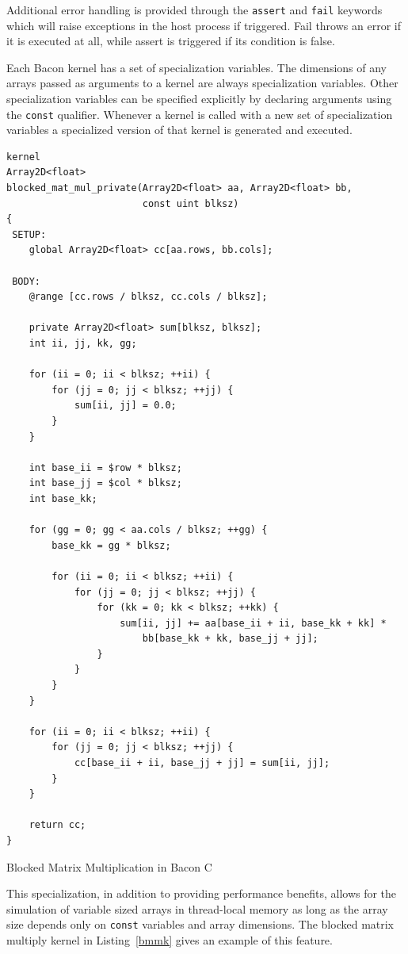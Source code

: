 \documentclass{llncs}
\begin{document}
Additional error handling is provided through the {\tt assert} and
{\tt fail} keywords which will raise exceptions in the host process if
triggered. Fail throws an error if it is executed at all, while assert
is triggered if its condition is false.

Each Bacon kernel has a set of specialization variables. The
dimensions of any arrays passed as arguments to a kernel are always
specialization variables. Other specialization variables can be
specified explicitly by declaring arguments using the {\tt const}
qualifier. Whenever a kernel is called with a new set of
specialization variables a specialized version of that kernel is
generated and executed.

\begin{listing}[t!]
\begin{verbatim}
kernel
Array2D<float>
blocked_mat_mul_private(Array2D<float> aa, Array2D<float> bb, 
                        const uint blksz)
{
 SETUP:
    global Array2D<float> cc[aa.rows, bb.cols];

 BODY:
    @range [cc.rows / blksz, cc.cols / blksz];

    private Array2D<float> sum[blksz, blksz];
    int ii, jj, kk, gg;

    for (ii = 0; ii < blksz; ++ii) {
        for (jj = 0; jj < blksz; ++jj) {
            sum[ii, jj] = 0.0;
        }
    }

    int base_ii = $row * blksz;
    int base_jj = $col * blksz;
    int base_kk;

    for (gg = 0; gg < aa.cols / blksz; ++gg) {
        base_kk = gg * blksz;

        for (ii = 0; ii < blksz; ++ii) {
            for (jj = 0; jj < blksz; ++jj) {
                for (kk = 0; kk < blksz; ++kk) {
                    sum[ii, jj] += aa[base_ii + ii, base_kk + kk] * 
                        bb[base_kk + kk, base_jj + jj];
                }
            }
        }
    }

    for (ii = 0; ii < blksz; ++ii) {
        for (jj = 0; jj < blksz; ++jj) {
            cc[base_ii + ii, base_jj + jj] = sum[ii, jj];
        }
    }

    return cc;
}
\end{verbatim}
\caption{Blocked Matrix Multiplication in Bacon C}\label{bmmk}
\end{listing}
\afterpage{\FloatBarrier}

This specialization, in addition to providing performance benefits,
allows for the simulation of variable sized arrays in thread-local
memory as long as the array size depends only on {\tt const} variables
and array dimensions. The blocked matrix multiply kernel in
Listing~\ref{bmmk} gives an example of this feature.
\end{document}
